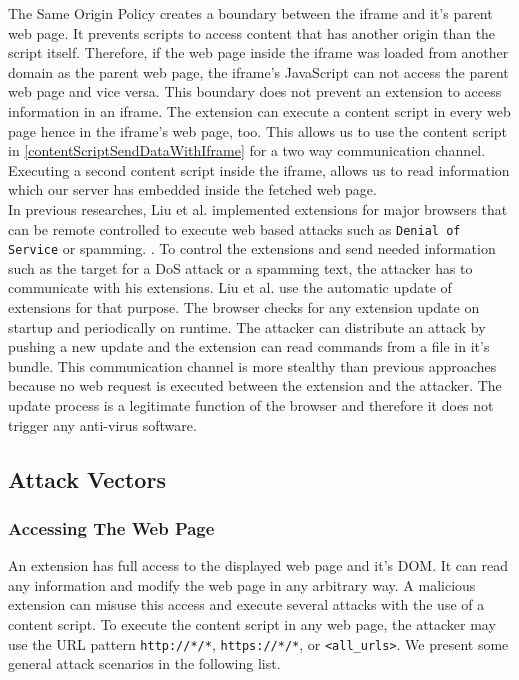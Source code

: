 		The Same Origin Policy creates a boundary between the iframe and it's parent web page. It prevents scripts to access content that has another origin than the script itself. Therefore, if the web page inside the iframe was loaded from another domain as the parent web page, the iframe's JavaScript can not access the parent web page and vice versa. This boundary does not prevent an extension to access information in an iframe. The extension can execute a content script in every web page hence in the iframe's web page, too. This allows us to use the content script in \autoref{contentScriptSendDataWithIframe} for a two way communication channel. Executing a second content script inside the iframe, allows us to read information which our server has embedded inside the fetched web page. \\
	
		In previous researches, Liu et al. implemented extensions for major browsers that can be remote controlled to execute web based attacks such as \texttt{Denial of Service} or spamming. \cite{liu2011botnet, Liu12chromeextensions:}. To control the extensions and send needed information such as the target for a DoS attack or a spamming text, the attacker has to communicate with his extensions. Liu et al. use the automatic update of extensions for that purpose. The browser checks for any extension update on startup and periodically on runtime. The attacker can distribute an attack by pushing a new update and the extension can read commands from a file in it's bundle. This communication channel is more stealthy than previous approaches because no web request is executed between the extension and the attacker. The update process is a legitimate function of the browser and therefore it does not trigger any anti-virus software. \\			
	
	\subsection{Attack Vectors}
	
		\subsubsection{Accessing The Web Page}
			
			An extension has full access to the displayed web page and it's DOM. It can read any information and modify the web page in any arbitrary way. A malicious extension can misuse this access and execute several attacks with the use of a content script. To execute the content script in any web page, the attacker may use the URL pattern \texttt{http://*/*}, \texttt{https://*/*}, or \texttt{<all\_urls>}. We present some general attack scenarios in the following list. \\
			

